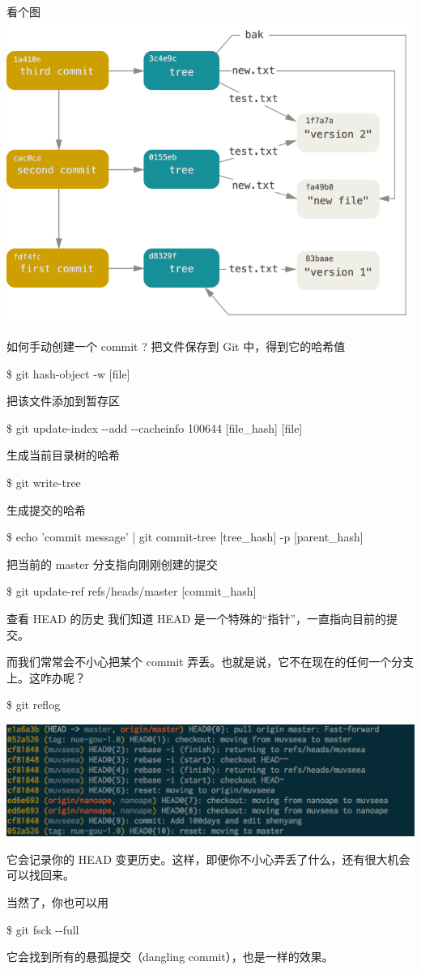 \documentclass{beamer}
\begin{document}
\begin{frame}{看个图}
    \includegraphics[width=\linewidth]{2018-10-26-21-48-43.png}
\end{frame}

\begin{frame}{如何手动创建一个 commit ?}
    把文件保存到 Git 中，得到它的哈希值

    \$ git hash-object -w [file]

    把该文件添加到暂存区

    \$ git update-index -{}-add -{}-cacheinfo 100644 [file\_hash] [file]

    生成当前目录树的哈希

    \$ git write-tree

    生成提交的哈希

    \$ echo 'commit message' | git commit-tree [tree\_hash] -p [parent\_hash]

    把当前的 master 分支指向刚刚创建的提交

    \$ git update-ref refs/heads/master [commit\_hash]
\end{frame}

\begin{frame}{查看 HEAD 的历史}
    我们知道 HEAD 是一个特殊的“指针”，一直指向目前的提交。

    而我们常常会不小心把某个 commit 弄丢。也就是说，它不在现在的任何一个分支上。这咋办呢？

    \$ git reflog

    \includegraphics[width=\linewidth]{2018-10-26-23-23-26.png}

    它会记录你的 HEAD 变更历史。这样，即便你不小心弄丢了什么，还有很大机会可以找回来。

    当然了，你也可以用

    \$ git fsck -{}-full

    它会找到所有的悬孤提交（dangling commit），也是一样的效果。
\end{frame}
\end{document}
